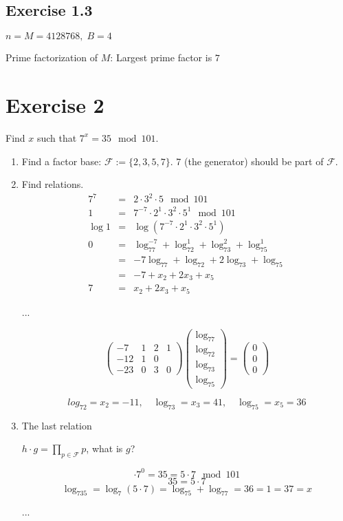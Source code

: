 \documentclass[a4paper]{scrreprt}
\begin{document}
\subsection*{Exercise 1.3}

$n = M = 4128768,\;B = 4$

Prime factorization of $M$: Largest prime factor is $7$

\section*{Exercise 2}

Find $x$ such that $7^x = 35\mod 101$.

\begin{enumerate}
    \item Find a factor base: $\mathcal F := \{2,3,5,7\}$. 7 (the generator) should be part of $\mathcal F$.
    \item Find relations.
        \begin{eqnarray*}
            7^7&=&2\cdot3^2\cdot5\mod101 \\
            1&=&7^{-7}\cdot2^1\cdot3^2\cdot5^1\mod 101 \\
            \log1&=&\log(7^{-7}\cdot2^1\cdot3^2\cdot5^1) \\
            0 &=& \log_77^{-7}+\log_72^1+\log_73^2+\log_75^1 \\
            &=& -7\log_77+\log_72+2\log_73+\log_75 \\
            &=& -7 + x_2+2x_3+x_5\\
            7 &=& x_2+2x_3+x_5 
        \end{eqnarray*}

        ...

        \[\begin{pmatrix}-7 & 1 & 2 & 1\\-12 & 1 & 0\\-23 & 0 & 3 & 0\end{pmatrix}
            \begin{pmatrix}\log_77\\\log_72\\\log_73\\\log_75\end{pmatrix}
                = \begin{pmatrix}0\\0\\0\end{pmatrix}\]

        \[log_72=x_2=-11,\quad\log_73=x_3=41,\quad\log_75=x_5=36\]
    \item The last relation

        $h\cdot g=\prod_{p\in\mathcal F}p$, what is $g$?

        \[\cdot7^0=35=5\cdot7\mod 101\]
        \[35=5\cdot 7\]
        \[\log_735=\log_7(5\cdot7)=\log_75+\log_77 = 36=1=37=x\]

        ...
\end{enumerate}
\end{document}
